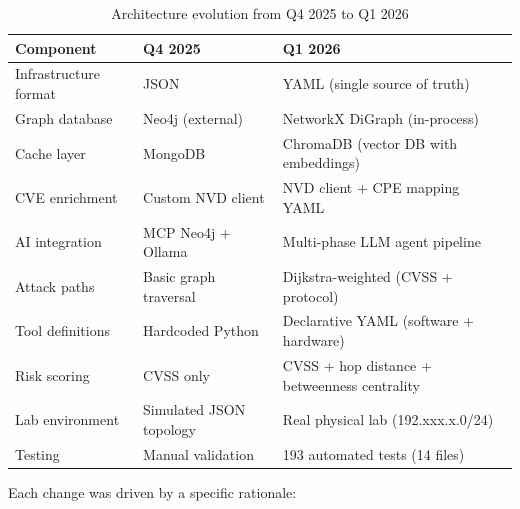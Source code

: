 \documentclass[11pt,a4paper]{article}
\begin{document}
\begin{table}[H]
\centering
\begin{tabular}{@{}lll@{}}
\toprule
\textbf{Component} & \textbf{Q4 2025} & \textbf{Q1 2026} \\
\midrule
Infrastructure format & JSON & YAML (single source of truth) \\
Graph database & Neo4j (external) & NetworkX DiGraph (in-process) \\
Cache layer & MongoDB & ChromaDB (vector DB with embeddings) \\
CVE enrichment & Custom NVD client & NVD client + CPE mapping YAML \\
AI integration & MCP Neo4j + Ollama & Multi-phase LLM agent pipeline \\
Attack paths & Basic graph traversal & Dijkstra-weighted (CVSS + protocol) \\
Tool definitions & Hardcoded Python & Declarative YAML (software + hardware) \\
Risk scoring & CVSS only & CVSS + hop distance + betweenness centrality \\
Lab environment & Simulated JSON topology & Real physical lab (192.xxx.x.0/24) \\
Testing & Manual validation & 193 automated tests (14 files) \\
\bottomrule
\end{tabular}
\caption{Architecture evolution from Q4 2025 to Q1 2026}
\label{tab:changes}
\end{table}

Each change was driven by a specific rationale:
\end{document}
